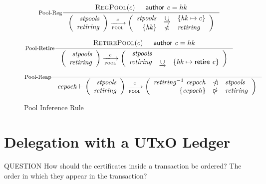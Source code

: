 \documentclass[11pt,a4paper]{article}
\newenvironment{question}
  {\begin{bclogo}[logo=\bcquestion, couleur=orange!10, arrondi=0.2]{ QUESTION}}
  {\end{bclogo}}
\newcommand{\restrictdom}{\lhd}
\newcommand{\subtractdom}{\mathbin{\slashed{\restrictdom}}}
\newcommand{\restrictrange}{\rhd}
\newcommand{\subtractrange}{\mathbin{\slashed{\restrictrange}}}
\newcommand{\unionoverride}{\mathbin{\underrightarrow\cup}}
\newcommand{\var}[1]{\mathit{#1}}
\newcommand{\fun}[1]{\mathsf{#1}}
\newcommand{\trans}[2]{\xlongrightarrow[\textsc{#1}]{#2}}
\newcommand{\RegPool}[1]{\textsc{RegPool}(#1)}
\newcommand{\RetirePool}[1]{\textsc{RetirePool}(#1)}
\newcommand{\cauthor}[1]{\fun{author}~ \var{#1}}
\newcommand{\retire}[1]{\fun{retire}~ \var{#1}}
\begin{document}
\begin{figure}
  \begin{equation}\label{eq:pool-reg}
    \inference[Pool-Reg]
    {
      \RegPool{c} & \cauthor{c} = hk
    }
    {
      \left(
      \begin{array}{r}
        \var{stpools} \\
        \var{retiring}
      \end{array}
      \right)
      \trans{pool}{c}
      \left(
      \begin{array}{rcl}
        \var{stpools} & \unionoverride & \{\var{hk} \mapsto c\} \\
        \{\var{hk}\} & \subtractdom & \var{retiring} \\
      \end{array}
      \right)
    }
  \end{equation}


  \begin{equation}\label{eq:pool-ret}
    \inference[Pool-Retire]
    {
    \RetirePool{c} & \cauthor{c} = hk
  }
  {
    \left(
      \begin{array}{r}
        \var{stpools} \\
        \var{retiring}
      \end{array}
    \right)
    \trans{pool}{c}
    \left(
      \begin{array}{rcl}
        \var{stpools} \\
        \var{retiring} & \unionoverride & \{\var{hk} \mapsto \retire c\} \\
      \end{array}
    \right)
  }
  \end{equation}

  \begin{equation}\label{eq:pool-reap}
    \inference[Pool-Reap]
    {
    }
    {
      \var{cepoch} \vdash
      \left(
      \begin{array}{r}
        \var{stpools} \\
        \var{retiring}
      \end{array}
      \right)
      \trans{pool}{c}
      \left(
      \begin{array}{rcl}
        \var{retiring}^{-1} ~ \var{cepoch} & \subtractdom & \var{stpools} \\
        \{\var{cepoch}\} & \subtractrange & \var{retiring} \\
      \end{array}
      \right)
    }
  \end{equation}
  \caption{Pool Inference Rule}
  \label{fig:pool-rules}
\end{figure}


\section{Delegation with a UTxO Ledger}

\begin{question}
How should the certificates inside a transaction be ordered?
The order in which they appear in the transaction?
\end{question}



\end{document}
